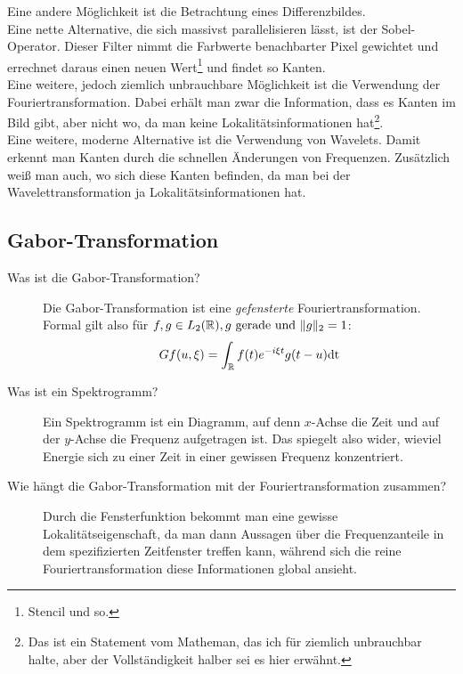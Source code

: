 \begin{description}
      Eine andere Möglichkeit ist die Betrachtung eines Differenzbildes.\\

      Eine nette Alternative, die sich massivst parallelisieren lässt, ist der Sobel-Operator. Dieser Filter nimmt die
      Farbwerte benachbarter Pixel gewichtet und errechnet daraus einen neuen Wert\footnote{Stencil und so.} und findet
      so Kanten.\\

      Eine weitere, jedoch ziemlich unbrauchbare Möglichkeit ist die Verwendung der Fouriertransformation. Dabei erhält
      man zwar die Information, dass es Kanten im Bild gibt, aber nicht wo, da man keine Lokalitätsinformationen 
      hat\footnote{Das ist ein Statement vom Matheman, das ich für ziemlich unbrauchbar halte, aber der Vollständigkeit
      halber sei es hier erwähnt.}.\\

      Eine weitere, moderne Alternative ist die Verwendung von Wavelets. Damit erkennt man Kanten durch die schnellen
      Änderungen von Frequenzen. Zusätzlich weiß man auch, wo sich diese Kanten befinden, da man bei der Wavelettransformation
      ja Lokalitätsinformationen hat.
\end{description}
\subsection{Gabor-Transformation}
\begin{description}
  \item[Was ist die Gabor-Transformation?]
    Die Gabor-Transformation ist eine \emph{gefensterte} Fouriertransformation.\\
    Formal gilt also für $f,g \in L_2(\mathbb{R}), g \text{ gerade und }\|g\|_2 = 1$:
    $$ Gf(u,\xi) = \int_{\mathbb{R}} f(t) e^{-i\xi t} g(t-u) \text{dt} $$
  \item[Was ist ein Spektrogramm?]
    Ein Spektrogramm ist ein Diagramm, auf denn $x$-Achse die Zeit und auf der $y$-Achse die Frequenz aufgetragen ist.
    Das spiegelt also wider, wieviel Energie sich zu einer Zeit in einer gewissen Frequenz konzentriert.
  \item[Wie hängt die Gabor-Transformation mit der Fouriertransformation zusammen?]
    Durch die Fensterfunktion bekommt man eine gewisse Lokalitätseigenschaft, da man dann Aussagen über die
    Frequenzanteile in dem spezifizierten Zeitfenster treffen kann, während sich die reine Fouriertransformation diese
    Informationen global ansieht.
\end{description}
